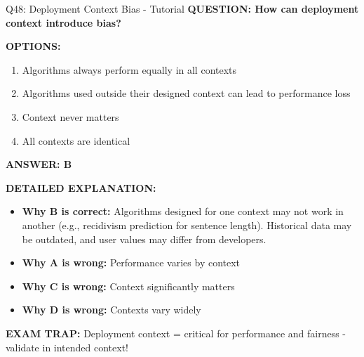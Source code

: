 \documentclass[8pt]{beamer}
\begin{document}
	\begin{frame}{Q48: Deployment Context Bias - Tutorial}
		\fontsize{6.5}{7.5}\selectfont
		\textbf{QUESTION: How can deployment context introduce bias?}
		
		\vspace{0.1cm}
		\textbf{OPTIONS:}
		\begin{enumerate}
			\item Algorithms always perform equally in all contexts
			\item Algorithms used outside their designed context can lead to performance loss
			\item Context never matters
			\item All contexts are identical
		\end{enumerate}
		
		\vspace{0.1cm}
		\textcolor{myblue}{\textbf{ANSWER: B}}
		
		\vspace{0.1cm}
		\textbf{DETAILED EXPLANATION:}
		\begin{itemize}
			\item \textbf{Why B is correct:} Algorithms designed for one context may not work in another (e.g., recidivism prediction for sentence length). Historical data may be outdated, and user values may differ from developers.
			\item \textbf{Why A is wrong:} Performance varies by context
			\item \textbf{Why C is wrong:} Context significantly matters
			\item \textbf{Why D is wrong:} Contexts vary widely
		\end{itemize}
		
		\textcolor{myred}{\textbf{EXAM TRAP:}} Deployment context = \textcolor{myblue}{critical for performance and fairness} - validate in intended context!
	\end{frame}
	
\end{document}
